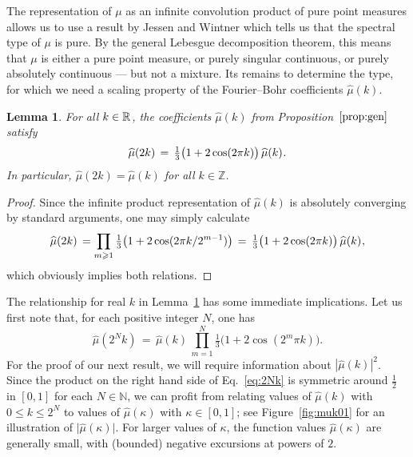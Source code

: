 \documentclass[11pt,a4paper]{amsart}
\theoremstyle{plain}
\newtheorem{lemma}[theorem]{Lemma}
\theoremstyle{definition}
\numberwithin{equation}{section}
\newcommand{\ts}{\hspace{0.5pt}}
\newcommand{\ZZ}{\mathbb{Z}}
\newcommand{\RR}{\mathbb{R}\ts}
\newcommand{\NN}{\mathbb{N}}
\begin{document}
The representation of $\mu$ as an infinite convolution
product of pure point measures allows
us to use a result by Jessen and Wintner \cite[Thm.~35]{JW} which
tells us that the spectral type of $\mu$ is pure. By the
general Lebesgue decomposition theorem, this means that 
 $\mu$ is
either  a pure point measure, or purely singular continuous, or
purely absolutely continuous --- but not a mixture. Its remains
to determine the type, for which
we need a scaling property of the Fourier--Bohr coefficients
$\widehat{\mu} (k)$.

\begin{lemma}\label{lem:FB}
  For all\/ $k\in\RR$, the coefficients\/ $\widehat{\mu} (k)$ from
  Proposition~$\ref{prop:gen}$ satisfy 
\[
   \widehat{\mu} (2k) \, = \,
   \tfrac{1}{3} \bigl( 1 + 2 \cos(2 \pi k)\bigr)
     \, \widehat{\mu} (k) \ts.
\]
In particular, $\widehat{\mu} (2k) = \widehat{\mu} (k)$ for all\/
$k\in\ZZ$.
\end{lemma}

\begin{proof}
  Since the infinite product representation of $\widehat{\mu}(k)$ is
  absolutely converging by standard arguments, one may simply
  calculate
\[
   \widehat{\mu} (2k) \, = \prod_{m\geqslant 1}
   \tfrac{1}{3} \bigl( 1 + 2 \cos(2 \pi k/2^{m-1}) \bigr)
   \, = \, \tfrac{1}{3} \bigl( 1 + 2 \cos(2 \pi k)\bigr)
   \, \widehat{\mu} (k) \ts ,
\]
which obviously implies both relations.
\end{proof}



The relationship for real $k$ in Lemma~\ref{lem:FB} has some immediate
implications. Let us first note that, for each positive integer $N$,
one has
\begin{equation}\label{eq:2Nk}
   \widehat{\mu} (2^N k) \, = \, \widehat{\mu} (k)\, 
   \prod_{m=1}^{N}  \tfrac{1}{3} 
   \bigl( 1 + 2 \cos(2^m \pi k)\bigr).
\end{equation}
For the proof of our next result, we will require information about
$|\widehat{\mu} (k)|^2$. Since the product on the right hand side of
Eq.~\eqref{eq:2Nk} is symmetric around $\frac{1}{2}$ in $[0,1]$ for
each $N\in\NN$, we can profit from relating values of
$\widehat{\mu}(k)$ with $ 0 \leqslant k \leqslant 2^N$ to values of
$\widehat{\mu}(\kappa)$ with $\kappa \in [0,1]$; see
Figure~\ref{fig:muk01} for an illustration of
$\lvert\widehat{\mu} (\kappa)\rvert$. For larger values of $\kappa$,
the function values $\widehat{\mu} (\kappa)$ are generally
small, with (bounded) negative excursions at powers of $2$. 
\end{document}

